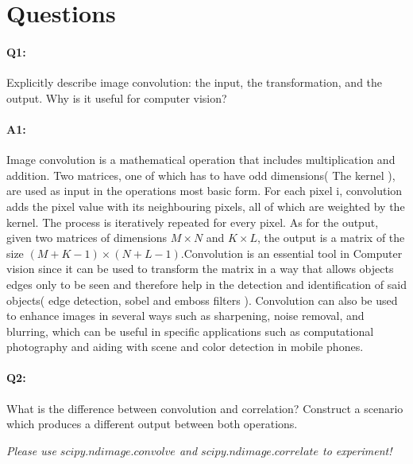 \section*{Questions}

\paragraph{Q1:} Explicitly describe image convolution: the input, the transformation, and the output. Why is it useful for computer vision?

\paragraph{A1:} Image convolution is a mathematical operation that includes multiplication and addition. Two matrices, one of which has to have odd dimensions( The kernel ), are used as input in the operations most basic form. For each pixel i, convolution adds the pixel value with its neighbouring pixels, all of which are weighted by the kernel. The process is iteratively repeated for every pixel. As for the output, given two matrices of dimensions $M\times N$ and $K\times L$, the output is a matrix of the size $(M+K-1)\times (N+L-1)$.Convolution is an essential tool in Computer vision since it can be used to transform the matrix in a way that allows objects edges only to be seen and therefore help in the detection and identification of said objects( edge detection, sobel and emboss filters ). Convolution can also be used to enhance images in several ways such as sharpening, noise removal, and blurring, which can be useful in specific applications such as computational photography and aiding with scene and color detection in mobile phones.




\pagebreak
\paragraph{Q2:} What is the difference between convolution and correlation? Construct a scenario which produces a different output between both operations.

\emph{Please use \href{https://docs.scipy.org/doc/scipy/reference/generated/scipy.ndimage.convolve.html}{$scipy.ndimage.convolve$} and \href{https://docs.scipy.org/doc/scipy/reference/generated/scipy.ndimage.correlate.html}{$scipy.ndimage.correlate$} to experiment!}

